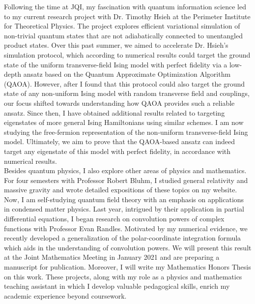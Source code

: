 Following the time at JQI, my fascination with quantum information science led to my current research project with Dr. Timothy Hsieh at the Perimeter Institute for Theoretical Physics. The project explores efficient variational simulation of non-trivial quantum states that are not adiabatically connected to unentangled product states. Over this past summer, we aimed to accelerate Dr. Hsieh's simulation protocol, which according to numerical results could target the ground state of the uniform transverse-field Ising model with perfect fidelity via a low-depth ansatz based on the Quantum Approximate Optimization Algorithm (QAOA). However, after I found that this protocol could also target the ground state of any non-uniform Ising model with random transverse field and couplings, our focus shifted towards understanding how QAOA provides such a reliable ansatz. Since then, I have obtained additional results related to targeting eigenstates of more general Ising Hamiltonians using similar schemes. I am now studying the free-fermion representation of the non-uniform transverse-field Ising model. Ultimately, we aim to prove that the QAOA-based ansatz can indeed target any eigenstate of this model with perfect fidelity, in accordance with numerical results.  \\

Besides quantum physics, I also explore other areas of physics and mathematics. For four semesters with Professor Robert Bluhm, I studied general relativity and massive gravity and wrote detailed expositions of these topics on my website. Now, I am self-studying quantum field theory with an emphasis on applications in condensed matter physics. Last year, intrigued by their application in partial differential equations, I began research on convolution powers of complex functions with Professor Evan Randles. Motivated by my numerical evidence, we recently developed a generalization of the polar-coordinate integration formula which aids in the understanding of convolution powers. We will present this result at the Joint Mathematics Meeting in January 2021 and are preparing a manuscript for publication. Moreover, I will write my Mathematics Honors Thesis on this work. These projects, along with my role as a physics and mathematics teaching assistant in which I develop valuable pedagogical skills, enrich my academic experience beyond coursework. \\ 



